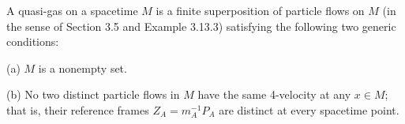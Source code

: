 A quasi-gas on a spacetime $M$ is a finite superposition of particle flows on $M$ (in the sense of Section 3.5 and Example 3.13.3) satisfying the following two generic conditions:

(a) $M$ is a nonempty set.

(b) No two distinct particle flows in $M$ have the same 4-velocity at any $x \in M$; that is, their reference frames $Z_A = m_A^{-1} P_A$ are distinct at every spacetime point.
